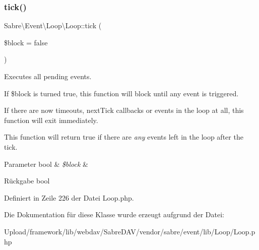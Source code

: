 \subsubsection{\texorpdfstring{tick()}{tick()}}
{\footnotesize\ttfamily Sabre\textbackslash{}\+Event\textbackslash{}\+Loop\textbackslash{}\+Loop\+::tick (\begin{DoxyParamCaption}\item[{}]{\$block = {\ttfamily false} }\end{DoxyParamCaption})}

Executes all pending events.

If \$block is turned true, this function will block until any event is triggered.

If there are now timeouts, next\+Tick callbacks or events in the loop at all, this function will exit immediately.

This function will return true if there are {\itshape any} events left in the loop after the tick.


\begin{DoxyParams}[1]{Parameter}
bool & {\em \$block} & \\
\hline
\end{DoxyParams}
\begin{DoxyReturn}{Rückgabe}
bool 
\end{DoxyReturn}


Definiert in Zeile 226 der Datei Loop.\+php.



Die Dokumentation für diese Klasse wurde erzeugt aufgrund der Datei\+:\begin{DoxyCompactItemize}
\item 
Upload/framework/lib/webdav/\+Sabre\+D\+A\+V/vendor/sabre/event/lib/\+Loop/Loop.\+php\end{DoxyCompactItemize}
